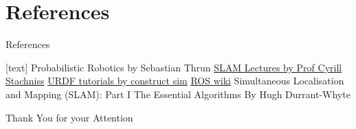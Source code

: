 \documentclass{beamer}
\begin{document}
\section{References}
\begin{frame}{References}
\begin{thebibliography}{}
[text]
 Probabilistic Robotics by Sebastian Thrun
 \href{https://www.youtube.com/playlist?list=PLgnQpQtFTOGQrZ4O5QzbIHgl3b1JHimN\_}{SLAM Lectures by Prof Cyrill Stachniss}
 \href{https://www.theconstructsim.com/ros-projects-exploring-ros-using-2-wheeled-robot-part-1/}{URDF tutorials by construct sim}
 \href{http://wiki.ros.org/ROS/Tutorials}{ROS wiki}
 Simultaneous Localisation and Mapping (SLAM): Part I The Essential Algorithms By Hugh Durrant-Whyte
\end{thebibliography}
\end{frame}


\begin{frame}
\Huge{\centerline{Thank You for your Attention}}
\end{frame}
\end{document}
